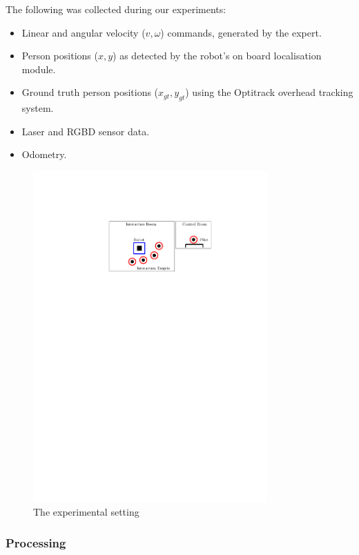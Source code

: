 \documentclass[a4paper,11pt]{report}
\begin{document}
The following was collected during our experiments:

\begin{itemize}
	\item Linear and angular velocity ($v,\omega$) commands, generated by the expert. 
	\item Person positions  ($x,y$) as detected by the robot's on board localisation module.
	\item Ground truth person positions ($x_{gt},y_{gt}$) using the Optitrack overhead tracking system.
	\item Laser and RGBD sensor data.
	\item Odometry.
\end{itemize}

	\begin{figure}
	\centering
	    \includegraphics[width=0.8\textwidth]{figures/experiment.pdf}
	  \caption[Conv layer]{The experimental setting}
	  \label{fig:experiment}
	\end{figure}

\subsubsection{Processing}
\end{document}
